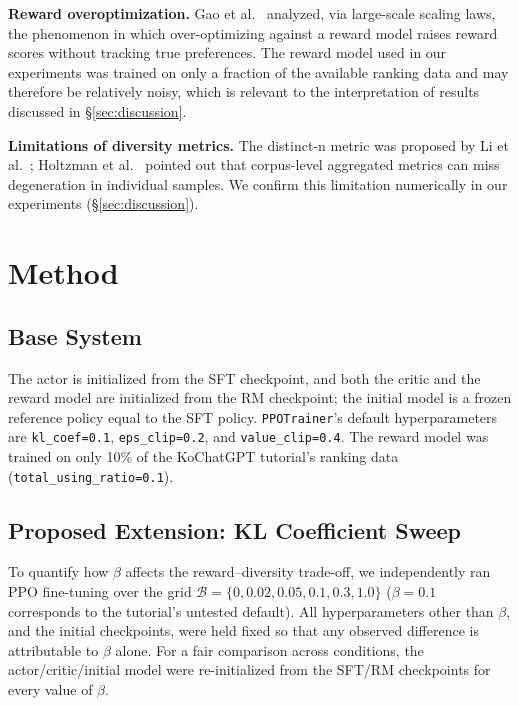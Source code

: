 \documentclass[conference]{IEEEtran}
\begin{document}
\textbf{Reward overoptimization.} Gao et al.~\cite{gao2023scaling}
analyzed, via large-scale scaling laws, the phenomenon in which
over-optimizing against a reward model raises reward scores without
tracking true preferences. The reward model used in our experiments
was trained on only a fraction of the available ranking data and may
therefore be relatively noisy, which is relevant to the interpretation
of results discussed in \S\ref{sec:discussion}.

\textbf{Limitations of diversity metrics.} The distinct-n metric was
proposed by Li et al.~\cite{li2016diversity}; Holtzman et
al.~\cite{holtzman2020curious} pointed out that corpus-level aggregated
metrics can miss degeneration in individual samples. We confirm this
limitation numerically in our experiments (\S\ref{sec:discussion}).

\section{Method}

\subsection{Base System}

The actor is initialized from the SFT checkpoint, and both the critic
and the reward model are initialized from the RM checkpoint; the
initial model is a frozen reference policy equal to the SFT policy.
\texttt{PPOTrainer}'s default hyperparameters are
\texttt{kl\_coef=0.1}, \texttt{eps\_clip=0.2}, and
\texttt{value\_clip=0.4}. The reward model was trained on only 10\% of
the KoChatGPT tutorial's ranking data (\texttt{total\_using\_ratio=0.1}).

\subsection{Proposed Extension: KL Coefficient Sweep}

To quantify how $\beta$ affects the reward--diversity trade-off, we
independently ran PPO fine-tuning over the grid $\mathcal{B} = \{0,
0.02, 0.05, 0.1, 0.3, 1.0\}$ ($\beta{=}0.1$ corresponds to the
tutorial's untested default). All hyperparameters other than $\beta$,
and the initial checkpoints, were held fixed so that any observed
difference is attributable to $\beta$ alone. For a fair comparison
across conditions, the actor/critic/initial model were re-initialized
from the SFT/RM checkpoints for every value of $\beta$.
\end{document}
